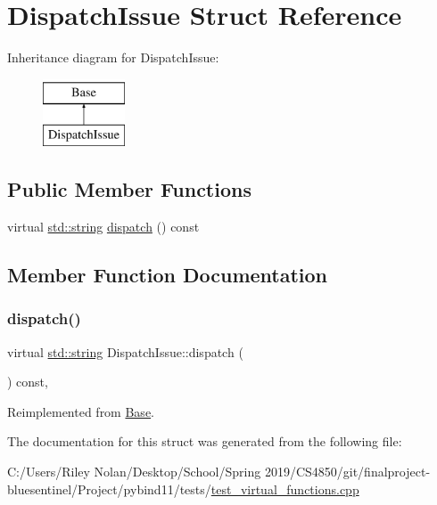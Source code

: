 \hypertarget{struct_dispatch_issue}{}\section{Dispatch\+Issue Struct Reference}
\label{struct_dispatch_issue}
Inheritance diagram for Dispatch\+Issue\+:\begin{figure}[H]
\begin{center}
\leavevmode
\includegraphics[height=2.000000cm]{struct_dispatch_issue}
\end{center}
\end{figure}
\subsection*{Public Member Functions}
\begin{DoxyCompactItemize}
\item 
virtual \mbox{\hyperlink{_s_d_l__opengl__glext_8h_ab4ccfaa8ab0e1afaae94dc96ef52dde1}{std\+::string}} \mbox{\hyperlink{struct_dispatch_issue_ad9b65317bc3660b698ad4b917b8a0b4e}{dispatch}} () const
\end{DoxyCompactItemize}


\subsection{Member Function Documentation}
\mbox{\label{struct_dispatch_issue_ad9b65317bc3660b698ad4b917b8a0b4e}} 
\subsubsection{\texorpdfstring{dispatch()}{dispatch()}}
{\footnotesize\ttfamily virtual \mbox{\hyperlink{_s_d_l__opengl__glext_8h_ab4ccfaa8ab0e1afaae94dc96ef52dde1}{std\+::string}} Dispatch\+Issue\+::dispatch (\begin{DoxyParamCaption}{ }\end{DoxyParamCaption}) const\hspace{0.3cm}{\ttfamily [inline]}, {\ttfamily [virtual]}}



Reimplemented from \mbox{\hyperlink{struct_base_a88a122105aa11d0f4e2113beb2a8f669}{Base}}.



The documentation for this struct was generated from the following file\+:\begin{DoxyCompactItemize}
\item 
C\+:/\+Users/\+Riley Nolan/\+Desktop/\+School/\+Spring 2019/\+C\+S4850/git/finalproject-\/bluesentinel/\+Project/pybind11/tests/\mbox{\hyperlink{test__virtual__functions_8cpp}{test\+\_\+virtual\+\_\+functions.\+cpp}}\end{DoxyCompactItemize}
